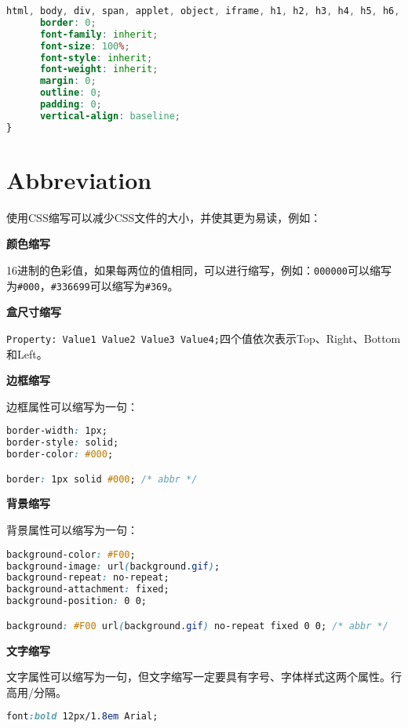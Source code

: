 \begin{lstlisting}[language=CSS]
html, body, div, span, applet, object, iframe, h1, h2, h3, h4, h5, h6, p, blockquote, pre, a, abbr, acronym, address, big, cite, code, del, dfn, em, font, ins, kbd, q, s, samp, small, strike, strong, sub, sup, tt, var, dl, dt, dd, ol, ul, li, fieldset, form, label, legend, table, caption, tbody, tfoot, thead, tr, th, td {
      border: 0;
      font-family: inherit;
      font-size: 100%;
      font-style: inherit;
      font-weight: inherit;
      margin: 0;
      outline: 0;
      padding: 0;
      vertical-align: baseline;
}

\end{lstlisting}


\section{Abbreviation}

使用CSS缩写可以减少CSS文件的大小，并使其更为易读，例如：

\begin{compactenum}
\item \textbf{颜色缩写}

16进制的色彩值，如果每两位的值相同，可以进行缩写，例如：\texttt{000000}可以缩写为\texttt{\#000}，\texttt{\#336699}可以缩写为\texttt{\#369}。


\item \textbf{盒尺寸缩写}

\texttt{Property: Value1 Value2 Value3 Value4;}四个值依次表示Top、Right、Bottom和Left。

\item \textbf{边框缩写}

边框属性可以缩写为一句：

\begin{lstlisting}[language=CSS]
border-width: 1px;
border-style: solid;
border-color: #000;

border: 1px solid #000; /* abbr */
\end{lstlisting}

\item \textbf{背景缩写}

背景属性可以缩写为一句：

\begin{lstlisting}[language=CSS]
background-color: #F00;
background-image: url(background.gif);
background-repeat: no-repeat;
background-attachment: fixed;
background-position: 0 0;

background: #F00 url(background.gif) no-repeat fixed 0 0; /* abbr */
\end{lstlisting}

\item \textbf{文字缩写}

文字属性可以缩写为一句，但文字缩写一定要具有字号、字体样式这两个属性。行高用/分隔。

\begin{lstlisting}[language=CSS]
font:bold 12px/1.8em Arial;
\end{lstlisting}


\end{compactenum}


